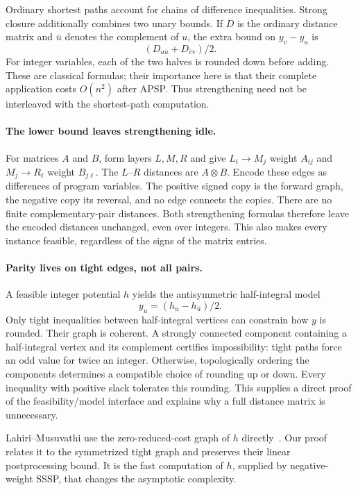 \documentclass[manuscript,11pt,screen,nonacm]{acmart}
\theoremstyle{definition}
\begin{document}
Ordinary shortest paths account for chains of difference inequalities. Strong closure additionally combines two unary bounds. If $D$ is the ordinary distance matrix and $\bar u$ denotes the complement of $u$, the extra bound on $y_v-y_u$ is
\[
 (D_{u\bar u}+D_{\bar v v})/2.
\]
For integer variables, each of the two halves is rounded down before adding. These are classical formulas; their importance here is that their complete application costs $O(n^2)$ after APSP. Thus strengthening need not be interleaved with the shortest-path computation.

\paragraph{The lower bound leaves strengthening idle.}
For matrices $A$ and $B$, form layers $L,M,R$ and give $L_i\to M_j$ weight $A_{ij}$ and $M_j\to R_\ell$ weight $B_{j\ell}$. The $L$--$R$ distances are $A\otimes B$. Encode these edges as differences of program variables. The positive signed copy is the forward graph, the negative copy its reversal, and no edge connects the copies. There are no finite complementary-pair distances. Both strengthening formulas therefore leave the encoded distances unchanged, even over integers. This also makes every instance feasible, regardless of the signs of the matrix entries.

\paragraph{Parity lives on tight edges, not all pairs.}
A feasible integer potential $h$ yields the antisymmetric half-integral model
\[
 y_u=(h_u-h_{\bar u})/2.
\]
Only tight inequalities between half-integral vertices can constrain how $y$ is rounded. Their graph is coherent. A strongly connected component containing a half-integral vertex and its complement certifies impossibility: tight paths force an odd value for twice an integer. Otherwise, topologically ordering the components determines a compatible choice of rounding up or down. Every inequality with positive slack tolerates this rounding. This supplies a direct proof of the feasibility/model interface and explains why a full distance matrix is unnecessary.

Lahiri--Musuvathi use the zero-reduced-cost graph of $h$ directly~\cite{lm2005}. Our proof relates it to the symmetrized tight graph and preserves their linear postprocessing bound. It is the fast computation of $h$, supplied by negative-weight SSSP, that changes the asymptotic complexity.
\end{document}
